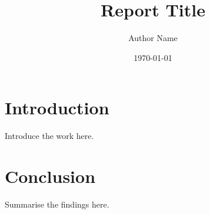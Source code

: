 \documentclass[12pt]{report}
\title{Report Title}
\author{Author Name}
\date{\today}
\begin{document}
\maketitle
\tableofcontents

\chapter{Introduction}
Introduce the work here.

\chapter{Conclusion}
Summarise the findings here.

% 
\end{document}
